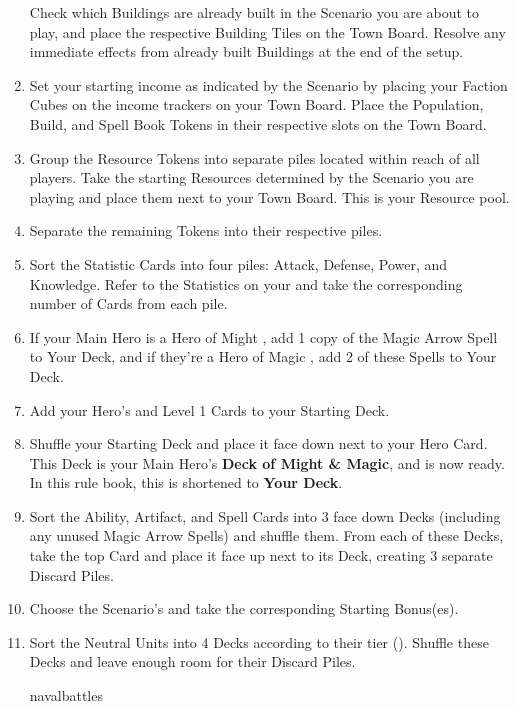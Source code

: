 \begin{multicols*}{2}
\begin{enumerate}
    Check which Buildings are already built in the Scenario you are about to play, and place the respective Building Tiles on the Town Board.
    Resolve any immediate effects from already built Buildings at the end of the setup.
  \item Set your starting income as indicated by the Scenario by placing your Faction Cubes on the income trackers on your Town Board.
    Place the Population, Build, and Spell Book Tokens in their respective slots on the Town Board.
  \item Group the Resource Tokens into separate piles located within reach of all players.
    Take the starting Resources determined by the Scenario you are playing and place them next to your Town Board.
    This is your Resource pool.
  \item Separate the remaining Tokens into their respective piles.
  \item Sort the Statistic Cards into four piles: Attack, Defense, Power, and Knowledge.
    Refer to the Statistics on your  and take the corresponding number of Cards from each pile.
  \item If your Main Hero is a Hero of Might , add 1 copy of the Magic Arrow Spell to Your Deck, and if they’re a Hero of Magic , add 2 of these Spells to Your Deck.
  \item Add your Hero's  and Level 1  Cards to your Starting Deck.
  \item Shuffle your Starting Deck and place it face down next to your Hero Card.
    This Deck is your Main Hero's \textbf{Deck of Might \& Magic}, and is now ready. In this rule book, this is shortened to \textbf{Your Deck}.
  \item Sort the Ability, Artifact, and Spell Cards into 3 face down Decks (including any unused Magic Arrow Spells) and shuffle them.
    From each of these Decks, take the top Card and place it face up next to its Deck, creating 3 separate Discard Piles.
  \item Choose the Scenario's  and take the corresponding Starting Bonus(es).
  \item Sort the Neutral Units into 4 Decks according to their tier ().
    Shuffle these Decks and leave enough room for their Discard Piles.
  \begin{expansion}[before skip balanced=0.3em,left=7mm]{navalbattles}

\end{expansion}
\end{enumerate}
\end{multicols*}

